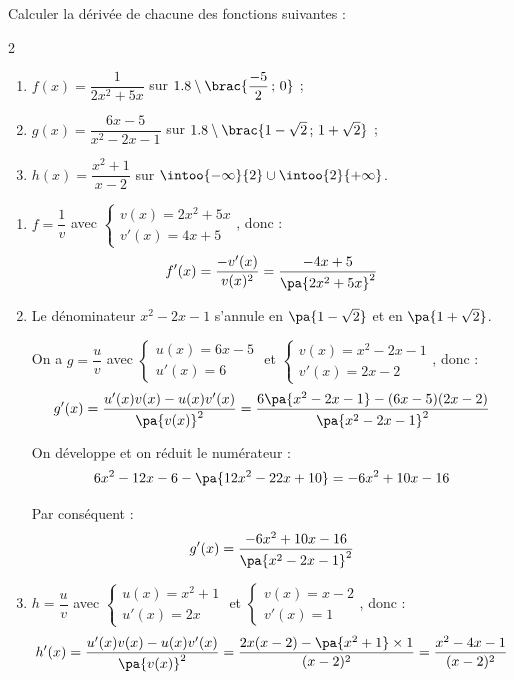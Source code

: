 \begin{methode}
	Calculer la dérivée de chacune des fonctions suivantes :
	\begin{multicols}{2}
		\begin{enumerate}[label=\alph*)]
			\item $f(x) = \dfrac{1}{2x^2 + 5x}$ sur $\R \setminus \brac{\dfrac{-5}{2}\,;\,0}$ ;
			\item $g(x) = \dfrac{6x - 5}{x^2 - 2x - 1}$ sur $\R \setminus \brac{1 - \sqrt{2}\,;\,1 + \sqrt{2}}$ ;
			\item $h(x) = \dfrac{x^2 + 1}{x - 2}$ sur $\intoo{-\infty}{2}\cup\intoo{2}{+\infty}$.
		\end{enumerate}
	\end{multicols}

	\begin{correction}
		\nline
		\begin{enumerate}[label=\alph*)]
			\item $f = \dfrac{1}{v}$ avec $\begin{cases}v(x) = 2x^2 + 5x\\v'(x) = 4x + 5\end{cases}$, donc :
			      \[
				      f'(x) = \dfrac{-v'(x)}{v(x)^2} = \dfrac{-4x + 5}{\pa{2x^2 + 5x}^2}
			      \]

			\item Le dénominateur $x^2 - 2x - 1$ s'annule en $\pa{1 - \sqrt{2}}$ et en $\pa{1 + \sqrt{2}}$.

			      On a $g = \dfrac{u}{v}$ avec $\begin{cases}u(x) = 6x - 5\\u'(x) = 6\end{cases}$ et $\begin{cases}v(x) = x^2 - 2x - 1\\v'(x) = 2x - 2\end{cases}$, donc :
			      \[
				      g'(x) = \dfrac{u'(x)v(x) - u(x)v'(x)}{\pa{v(x)}^2} = \dfrac{6\pa{x^2 - 2x - 1} - (6x - 5)(2x - 2)}{\pa{x^2 - 2x - 1}^2}
			      \]

			      On développe et on réduit le numérateur :
			      \[
				      6x^2 - 12x - 6 - \pa{12x^2 - 22x + 10} = -6x^2 + 10x - 16
			      \]

			      Par conséquent :
			      \[
				      g'(x) = \dfrac{-6x^2 + 10x - 16}{\pa{x^2 - 2x - 1}^2}
			      \]

			\item $h = \dfrac{u}{v}$ avec $\begin{cases}u(x) = x^2 + 1\\u'(x) = 2x\end{cases}$ et $\begin{cases}v(x) = x - 2\\v'(x) = 1\end{cases}$, donc :
			      \[
				      h'(x) = \dfrac{u'(x)v(x) - u(x)v'(x)}{\pa{v(x)}^2} = \dfrac{2x(x - 2) - \pa{x^2 + 1} \times 1}{(x - 2)^2} = \dfrac{x^2 - 4x - 1}{(x - 2)^2}
			      \]

		\end{enumerate}
	\end{correction}
\end{methode}

